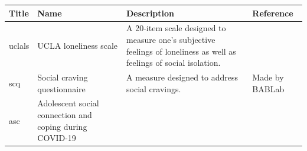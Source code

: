 \documentclass[]{book}
\begin{document}
\begin{longtable}[]{@{}llll@{}}
\toprule
\begin{minipage}[b]{0.22\columnwidth}\raggedright
Title\strut
\end{minipage} & \begin{minipage}[b]{0.27\columnwidth}\raggedright
Name\strut
\end{minipage} & \begin{minipage}[b]{0.22\columnwidth}\raggedright
Description\strut
\end{minipage} & \begin{minipage}[b]{0.18\columnwidth}\raggedright
Reference\strut
\end{minipage}\tabularnewline
\midrule
\endhead
\begin{minipage}[t]{0.22\columnwidth}\raggedright
uclals\strut
\end{minipage} & \begin{minipage}[t]{0.27\columnwidth}\raggedright
UCLA loneliness scale\strut
\end{minipage} & \begin{minipage}[t]{0.22\columnwidth}\raggedright
A 20-item scale designed to measure one's subjective feelings of loneliness as well as feelings of social isolation.\strut
\end{minipage} & \begin{minipage}[t]{0.18\columnwidth}\raggedright
\strut
\end{minipage}\tabularnewline
\begin{minipage}[t]{0.22\columnwidth}\raggedright
scq\strut
\end{minipage} & \begin{minipage}[t]{0.27\columnwidth}\raggedright
Social craving questionnaire\strut
\end{minipage} & \begin{minipage}[t]{0.22\columnwidth}\raggedright
A measure designed to address social cravings.\strut
\end{minipage} & \begin{minipage}[t]{0.18\columnwidth}\raggedright
Made by BABLab\strut
\end{minipage}\tabularnewline
\begin{minipage}[t]{0.22\columnwidth}\raggedright
asc\strut
\end{minipage} & \begin{minipage}[t]{0.27\columnwidth}\raggedright
Adolescent social connection and coping during COVID-19\strut
\end{minipage} & \begin{minipage}[t]{0.22\columnwidth}\raggedright

\end{minipage}
\end{longtable}
\end{document}
